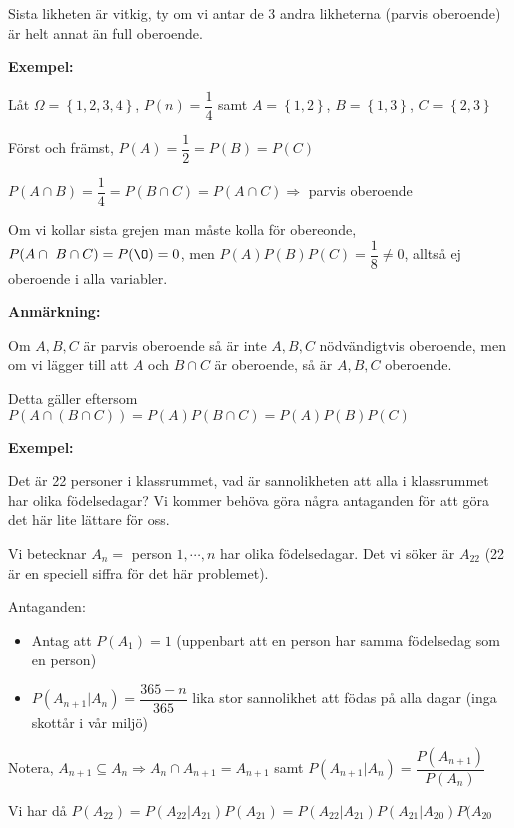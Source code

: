 \noindent Sista likheten är vitkig, ty om vi antar de 3 andra likheterna (parvis oberoende) är helt annat än full oberoende.
\par\bigskip
\noindent\textbf{Exempel:}\par
\noindent Låt $\Omega = \left\{1,2,3,4\right\}$, $P(n) = \dfrac{1}{4}$ samt $A = \left\{1,2\right\}$, $B=\left\{1,3\right\}$, $C = \left\{2,3\right\}$\par
\noindent Först och främst, $P(A) = \dfrac{1}{2} = P(B) = P(C)$\par
\noindent $P(A\cap B) = \dfrac{1}{4} = P(B\cap C) = P(A\cap C)\Rightarrow$ parvis oberoende\par
\noindent Om vi kollar sista grejen man måste kolla för obereonde, $P(A\cap\ B\cap C) = P(\O) = 0$, men $P(A)P(B)P(C) = \dfrac{1}{8}\neq0$, alltså ej oberoende i alla variabler.
\par\bigskip
\noindent\textbf{Anmärkning:}\par
\noindent Om $A,B,C$ är parvis oberoende så är inte $A,B,C$ nödvändigtvis oberoende, men om vi lägger till att $A$ och $B\cap C$ är oberoende, så är $A,B,C$ oberoende.\par
\noindent Detta gäller eftersom $P(A\cap(B\cap C)) = P(A)P(B\cap C) = P(A)P(B)P(C)$
\par\bigskip
\noindent\textbf{Exempel:}\par
\noindent Det är 22 personer i klassrummet, vad är sannolikheten att alla i klassrummet har olika födelsedagar? Vi kommer behöva göra några antaganden för att göra det här lite lättare för oss.\par
\noindent Vi betecknar $A_n = $ person $1,\cdots, n$ har olika födelsedagar. Det vi söker är $A_{22}$ (22 är en speciell siffra för det här problemet).\par
\noindent Antaganden:
\begin{itemize}
  \item Antag att $P(A_1) = 1$ (uppenbart att en person har samma födelsedag som en person)
  \item $P(A_{n+1}|A_n) = \dfrac{365-n}{365}$ lika stor sannolikhet att födas på alla dagar (inga skottår i vår miljö)
\end{itemize}\par
\noindent Notera, $A_{n+1}\subseteq A_n\Rightarrow A_n\cap A_{n+1} = A_{n+1}$ samt $P(A_{n+1}|A_n) = \dfrac{P(A_{n+1})}{P(A_n)}$
\par\bigskip
\noindent Vi har då $P(A_22) = P(A_{22}|A_{21})P(A_{21}) = P(A_{22}|A_{21})P(A_{21}|A_{20})P(A_{20}$\par
